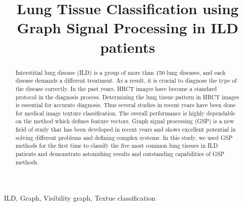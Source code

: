 \documentclass[conference]{IEEEtran}
\begin{document}
\title{Lung Tissue Classification using Graph Signal Processing in ILD patients}
\author{
\and
{}
\and
{}
\and
}

\maketitle

\begin{abstract}
Interstitial lung disease (ILD) is a group of more than 150 lung diseases, and each disease demands a different treatment. As a result, it is crucial to diagnose the type of the disease correctly. In the past years, HRCT images have become a standard protocol in the diagnosis process. Determining the lung tissue pattern in HRCT images is essential for accurate diagnosis. Thus several studies in recent years have been done for medical image texture classification. The overall performance is highly dependable on the method which defines feature vectors. Graph signal processing (GSP) is a new field of study that has been developed in recent years and shows excellent potential in solving different problems and defining complex systems. In this study, we used GSP methods for the first time to classify the five most common lung tissues in ILD patients and demonstrate astonishing results and outstanding capabilities of GSP methods.
\end{abstract}

\begin{IEEEkeywords}
ILD, Graph, Visibility graph, Textue classification
\end{IEEEkeywords}
\end{document}
